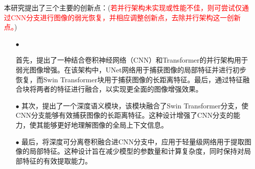 \documentclass[a4paper, 10pt]{article}
\begin{document}
		
		
		
		本研究提出了三个主要的创新点：(\textcolor{red}{若并行架构未实现或性能不佳，则可尝试仅通过CNN分支进行图像的弱光恢复，并相应调整创新点，去除并行架构这一创新点。})
		\begin{itemize}
			\item[$\bullet$]
			
			首先，提出了一种结合卷积神经网络（CNN）和Transformer的并行架构用于弱光图像增强。在该架构中，UNet网络用于捕获图像的局部特征并进行初步恢复，而Swin Transformer块用于捕获图像的长距离特征。最后，通过特征融合块将两者的特征进行融合，以实现更全面的图像增强效果。
			\item[$\bullet$] 
			其次，提出了一个深度语义模块，该模块融合了Swin Transformer分支，使CNN分支能够有效捕获图像的长距离特征。这种设计增强了CNN分支的能力，使其能够更好地理解图像的全局上下文信息。
			\item[$\bullet$]
			最后，将深度可分离卷积融合进CNN分支中，应用于轻量级网络用于提取图像的局部特征。这种设计旨在减少模型的参数量和计算复杂度，同时保持对局部特征的有效提取能力。
		\end{itemize}
		
\end{document}
